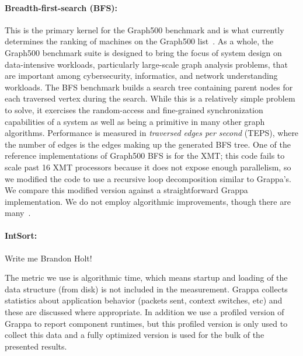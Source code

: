 \paragraph{Breadth-first-search (BFS):} This is the primary kernel for the Graph500 benchmark and is what currently determines the ranking of machines on the Graph500 list~\cite{graph500list}. As a whole, the Graph500 benchmark suite is designed to bring the focus of system design on data-intensive workloads, particularly large-scale graph analysis problems, that are important among cybersecurity, informatics, and network understanding workloads. The BFS benchmark builds a search tree containing parent nodes for each traversed vertex during the search.  While this is a relatively simple problem to solve, it exercises the random-access and fine-grained synchronization capabilities of a system as well as being a primitive in many other graph algorithms. Performance is measured in \emph{traversed edges per second\/} (TEPS), where the number of edges is the edges making up the generated BFS tree. One of the reference implementations of Graph500 BFS is for the XMT; this code fails to scale past 16 XMT processors because it does not expose enough parallelism, so we modified the code to use a recursive loop decomposition similar to Grappa's. We compare this modified version against a straightforward Grappa implementation. We do not employ algorithmic improvements, though there are many~\cite{Beamer:Graph500,Yoo:FixedPointGraph500}.

\paragraph{IntSort:}  Write me Brandon Holt!

The metric we use is algorithmic time, which means startup and loading of the data structure (from disk) is not included in the measurement.  Grappa collects statistics about application behavior (packets sent, context switches, etc) and these are discussed where appropriate.  In addition we use a profiled version of Grappa to report component runtimes, but this profiled version is only used to collect this data and a fully optimized version is used for the bulk of the presented results.


